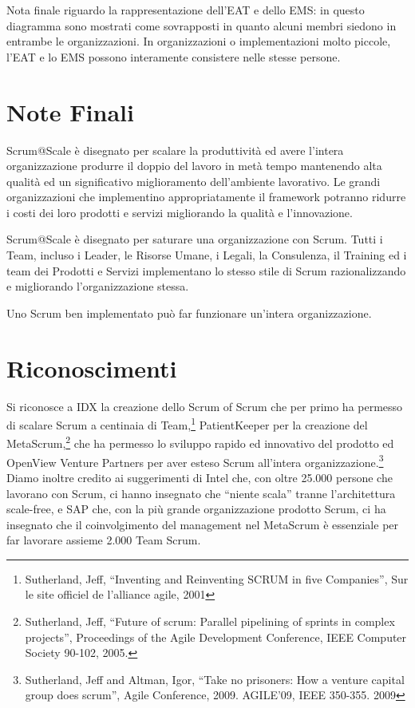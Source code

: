 \documentclass[12pt,a4paper,parskip=full]{scrartcl}
\begin{document}
Nota finale riguardo la rappresentazione dell'EAT e dello EMS: in questo diagramma sono mostrati come sovrapposti in quanto alcuni membri siedono in entrambe le organizzazioni. In organizzazioni o implementazioni molto piccole, l'EAT e lo EMS possono interamente consistere nelle stesse persone.

\section{Note Finali}
Scrum@Scale è disegnato per scalare la produttività ed avere l'intera organizzazione produrre il doppio del lavoro in metà tempo mantenendo alta qualità ed un significativo miglioramento dell'ambiente lavorativo. Le grandi organizzazioni che implementino appropriatamente il framework potranno ridurre i costi dei loro prodotti e servizi migliorando la qualità e l'innovazione.

Scrum@Scale è disegnato per saturare una organizzazione con Scrum. Tutti i Team,
incluso i Leader, le Risorse Umane, i Legali, la Consulenza, il Training ed i team dei Prodotti e Servizi implementano lo stesso stile di Scrum razionalizzando e migliorando l'organizzazione stessa.

Uno Scrum ben implementato può far funzionare un'intera organizzazione.

\section{Riconoscimenti}
Si riconosce a IDX la creazione dello Scrum of Scrum che per primo ha permesso di scalare Scrum a centinaia di Team,\footnote{Sutherland, Jeff,
``Inventing and Reinventing SCRUM in five Companies'', Sur le site officiel
de l'alliance agile, 2001} PatientKeeper per la creazione del MetaScrum,\footnote{Sutherland, Jeff, ``Future of scrum: Parallel pipelining
of sprints in complex projects'', Proceedings of the Agile Development
Conference,  IEEE Computer Society 90-102,  2005.}  che ha permesso lo sviluppo rapido ed innovativo del prodotto ed OpenView Venture Partners per aver esteso Scrum all'intera organizzazione.\footnote{Sutherland, Jeff and Altman,
Igor, ``Take no prisoners: How a venture capital group does scrum'', Agile
Conference, 2009. AGILE'09, IEEE 350-355.  2009} Diamo inoltre credito ai suggerimenti di Intel che, con oltre 25.000 persone che lavorano con Scrum, ci hanno insegnato che ``niente scala'' tranne l'architettura scale-free, e SAP che, con la più grande organizzazione prodotto Scrum, ci ha insegnato che il coinvolgimento del management nel MetaScrum è essenziale per far lavorare assieme 2.000 Team Scrum.
\end{document}
